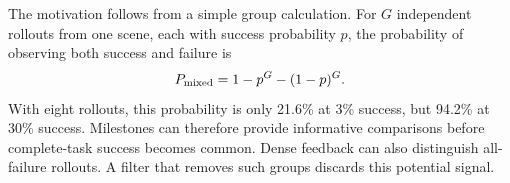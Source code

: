 The motivation follows from a simple group calculation. For $G$ independent rollouts from one scene, each with success probability $p$, the probability of observing both success and failure is
\begin{equation}
P_{\rm mixed}=1-p^G-(1-p)^G.
\label{eq:mixed}
\end{equation}
With eight rollouts, this probability is only 21.6\% at 3\% success, but 94.2\% at 30\% success. Milestones can therefore provide informative comparisons before complete-task success becomes common. Dense feedback can also distinguish all-failure rollouts. A filter that removes such groups discards this potential signal.
